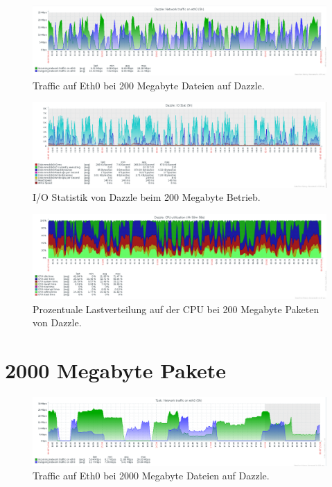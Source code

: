 \begin{figure}[htbp]
\centering
\includegraphics*[width=0.9\linewidth]{Abb/ZabbixDazzle/Standard/Standard200}
\caption{Traffic auf Eth0 bei 200 Megabyte Dateien auf Dazzle.}
\label{fig:Standard200}
\end{figure} %


\begin{figure}[htbp]
\centering
\includegraphics*[width=0.9\linewidth]{Abb/ZabbixDazzle/Standard/IoStatStandard200}

\caption{I/O Statistik von Dazzle beim 200 Megabyte Betrieb.}
\label{fig:IoStatDazzleStandard200}
\end{figure} %

\begin{figure}[htbp]
\centering
\includegraphics*[width=0.9\linewidth]{Abb/ZabbixDazzle/Standard/CPUStandard200}

\caption{Prozentuale Lastverteilung auf der CPU bei 200 Megabyte Paketen von Dazzle.}
\label{fig:CPUDazzleStandard200}
\end{figure}
\FloatBarrier
\newpage
\section{2000 Megabyte Pakete}

\begin{figure}[htbp]
\centering
\includegraphics*[width=0.9\linewidth]{Abb/ZabbixTusk/Standard/Standard2000}
\caption{Traffic auf Eth0 bei 2000 Megabyte Dateien auf Dazzle.}
\label{fig:Standard2000}
\end{figure} %


